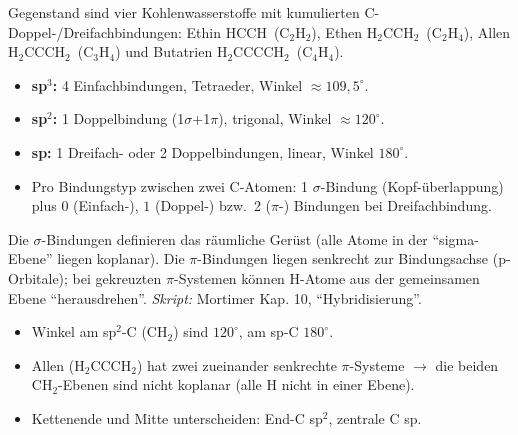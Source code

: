 

Gegenstand sind vier Kohlenwasserstoffe mit kumulierten
C-Doppel-/Dreifachbindungen: Ethin $\mathrm{HCCH}$~($\mathrm{C_2H_2}$),
Ethen $\mathrm{H_2CCH_2}$~($\mathrm{C_2H_4}$), Allen
$\mathrm{H_2CCCH_2}$~($\mathrm{C_3H_4}$) und Butatrien
$\mathrm{H_2CCCCH_2}$~($\mathrm{C_4H_4}$).

\begin{werkzeugkasten}
\begin{itemize}
  \item \textbf{sp$^3$:} 4 Einfachbindungen, Tetraeder, Winkel
        $\approx 109{,}5^\circ$.
  \item \textbf{sp$^2$:} 1 Doppelbindung (1$\sigma$+1$\pi$), trigonal,
        Winkel $\approx 120^\circ$.
  \item \textbf{sp:} 1 Dreifach- oder 2 Doppelbindungen, linear,
        Winkel $180^\circ$.
  \item Pro Bindungstyp zwischen zwei C-Atomen: 1 $\sigma$-Bindung
        (Kopf-überlappung) plus $0$ (Einfach-), $1$ (Doppel-) bzw.\ 2
        ($\pi$-) Bindungen bei Dreifachbindung.
\end{itemize}
\end{werkzeugkasten}

\begin{werkzeugkasten}
Die $\sigma$-Bindungen definieren das räumliche Gerüst (alle Atome in der
``sigma-Ebene'' liegen koplanar). Die $\pi$-Bindungen liegen senkrecht zur
Bindungsachse (p-Orbitale); bei gekreuzten $\pi$-Systemen k\"onnen
H-Atome aus der gemeinsamen Ebene ``herausdrehen''.
\textit{Skript:} Mortimer Kap. 10, ``Hybridisierung''.
\end{werkzeugkasten}

\begin{achtung}
\begin{itemize}
  \item Winkel am sp$^2$-C ($\mathrm{CH_2}$) sind $120^\circ$,
        am sp-C $180^\circ$.
  \item Allen ($\mathrm{H_2CCCH_2}$) hat zwei zueinander senkrechte
        $\pi$-Systeme $\rightarrow$ die beiden $\mathrm{CH_2}$-Ebenen sind
        nicht koplanar (alle H nicht in einer Ebene).
  \item Kettenende und Mitte unterscheiden: End-C sp$^2$, zentrale C sp.
\end{itemize}
\end{achtung}
